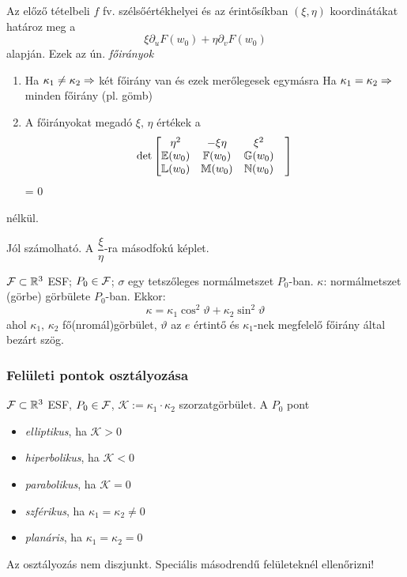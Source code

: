 \begin{te}[Főirányok]
  Az előző tételbeli $f$ fv. szélsőértékhelyei és az érintősíkban $(\xi,\eta)$ koordinátákat határoz meg a
  \[ \xi\partial_uF(w_0) + \eta\partial_vF(w_0)\]
  alapján. Ezek az ún. \emph{főirányok}

  {\listaszamkor
    \begin{enumerate}
    \item Ha $\kappa_1\neq \kappa_2 \Rightarrow$ két főirány van és ezek merőlegesek egymásra
      Ha $\kappa_1= \kappa_2 \Rightarrow$ minden főirány (pl. gömb)
    \item A főirányokat megadó $\xi,\,\eta$ értékek a
      \[ \det \begin{bmatrix} \eta^2 & -\xi\eta & \xi^2\\
	  \mathbb E(w_0) &\mathbb F(w_0) &\mathbb G(w_0) \\ \mathbb L(w_0) &\mathbb M(w_0) &\mathbb N(w_0) &  \end{bmatrix}\] = 0
    \end{enumerate}

  }
\end{te}
\begin{biz}
  nélkül.
\end{biz}

\begin{megj}
  Jól számolható. A $\dfrac{\xi}{\eta}$-ra másodfokú képlet.
\end{megj}

\begin{te}
  $\mathcal F\subset\mathbb{R}^3$ ESF; $P_0\in\mathcal F$; $\sigma$ egy tetszőleges normálmetszet $P_0$-ban. $\kappa$: normálmetszet (görbe)
  görbülete $P_0$-ban.
  Ekkor:
  \[ \kappa = \kappa_1\cos^2\vartheta + \kappa_2\sin^2\vartheta\]
  ahol $\kappa_1,\,\kappa_2$ fő(nromál)görbület, $\vartheta$ az $e$ értintő és $\kappa_1$-nek megfelelő főirány által
  bezárt szög.
\end{te}

\subsubsection{Felületi pontok osztályozása}
\begin{de}
  $\mathcal F\subset\mathbb{R}^3$ ESF, $P_0\in\mathcal F$, $\mathcal{K} := \kappa_1\cdot\kappa_2$ szorzatgörbület.
  A $P_0$ pont
  \begin{itemize}
  \item \emph{elliptikus}, ha $\mathcal{K} > 0$
  \item \emph{hiperbolikus}, ha $\mathcal{K} < 0$
  \item \emph{parabolikus}, ha $\mathcal{K} = 0$
  \item \emph{szférikus}, ha $\kappa_1 = \kappa_2 \neq 0$
  \item \emph{planáris}, ha $\kappa_1 = \kappa_2 = 0$
  \end{itemize}
\end{de}

\begin{megj}
  Az osztályozás nem diszjunkt. Speciális másodrendű felületeknél ellenőrizni!
\end{megj}

